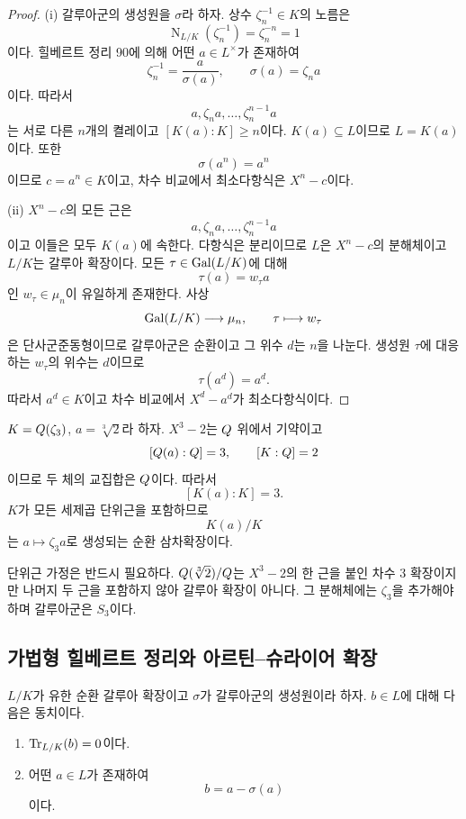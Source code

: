 \begin{proof}
(i) 갈루아군의 생성원을 $\sigma$라 하자. 상수 $\zeta_n^{-1}\in K$의 노름은
\[
  \operatorname N_{L/K}(\zeta_n^{-1})
  =\zeta_n^{-n}=1
\]
이다. 힐베르트 정리 90에 의해 어떤 $a\in L^\times$가 존재하여
\[
  \zeta_n^{-1}=\frac{a}{\sigma(a)},
  \qquad
  \sigma(a)=\zeta_n a
\]
이다. 따라서
\[
  a,\zeta_n a,\dots,\zeta_n^{n-1}a
\]
는 서로 다른 $n$개의 켤레이고 $[K(a):K]\ge n$이다. $K(a)\subseteq L$이므로 $L=K(a)$이다. 또한
\[
  \sigma(a^n)=a^n
\]
이므로 $c=a^n\in K$이고, 차수 비교에서 최소다항식은 $X^n-c$이다.

(ii) $X^n-c$의 모든 근은
\[
  a,\zeta_n a,\dots,\zeta_n^{n-1}a
\]
이고 이들은 모두 $K(a)$에 속한다. 다항식은 분리이므로 $L$은 $X^n-c$의 분해체이고 $L/K$는 갈루아 확장이다. 모든 $\tau\in\operatorname{Gal}(L/K)$에 대해
\[
  \tau(a)=w_\tau a
\]
인 $w_\tau\in\mu_n$이 유일하게 존재한다. 사상
\[
  \operatorname{Gal}(L/K)\longrightarrow\mu_n,
  \qquad\tau\longmapsto w_\tau
\]
은 단사군준동형이므로 갈루아군은 순환이고 그 위수 $d$는 $n$을 나눈다. 생성원 $\tau$에 대응하는 $w_\tau$의 위수는 $d$이므로
\[
  \tau(a^d)=a^d.
\]
따라서 $a^d\in K$이고 차수 비교에서 $X^d-a^d$가 최소다항식이다.
\end{proof}

\begin{example}
$K=Q(\zeta_3)$, $a=\sqrt[3]{2}$라 하자. $X^3-2$는 $Q$ 위에서 기약이고
\[
  [Q(a):Q]=3,
  \qquad
  [K:Q]=2
\]
이므로 두 체의 교집합은 $Q$이다. 따라서
\[
  [K(a):K]=3.
\]
$K$가 모든 세제곱 단위근을 포함하므로
\[
  K(a)/K
\]
는 $a\mapsto\zeta_3a$로 생성되는 순환 삼차확장이다.
\end{example}

\begin{pitfall}
단위근 가정은 반드시 필요하다. $Q(\sqrt[3]{2})/Q$는 $X^3-2$의 한 근을 붙인 차수 $3$ 확장이지만 나머지 두 근을 포함하지 않아 갈루아 확장이 아니다. 그 분해체에는 $\zeta_3$을 추가해야 하며 갈루아군은 $S_3$이다.
\end{pitfall}

\subsection{가법형 힐베르트 정리와 아르틴--슈라이어 확장}

\begin{theorem}
\label{thm:hilbert90-additive}
$L/K$가 유한 순환 갈루아 확장이고 $\sigma$가 갈루아군의 생성원이라 하자. $b\in L$에 대해 다음은 동치이다.
\begin{enumerate}[label=(\roman*)]
  \item $\operatorname{Tr}_{L/K}(b)=0$이다.
  \item 어떤 $a\in L$가 존재하여
  \[
    b=a-\sigma(a)
  \]
  이다.
\end{enumerate}
\end{theorem}

